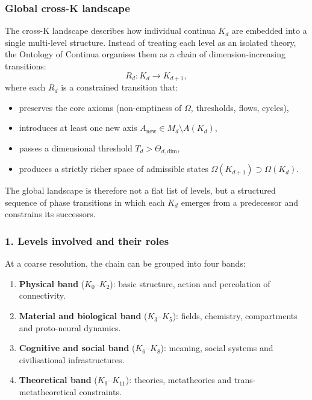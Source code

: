 
\subsubsection{Global cross-K landscape}
\label{sec:crossk-global-landscape}

The cross-K landscape describes how individual continua $K_d$ are embedded
into a single multi-level structure. Instead of treating each level as an
isolated theory, the Ontology of Continua organises them as a chain of
dimension-increasing transitions:
\[
R_d : K_d \rightarrow K_{d+1},
\]
where each $R_d$ is a constrained transition that:
\begin{itemize}
  \item preserves the core axioms (non-emptiness of $\Omega$, thresholds,
        flows, cycles),
  \item introduces at least one new axis $A_{\text{new}} \in M_d \setminus A(K_d)$,
  \item passes a dimensional threshold $T_d > \Theta_{d,\text{dim}}$,
  \item produces a strictly richer space of admissible states
        $\Omega(K_{d+1}) \supset \Omega(K_d)$.
\end{itemize}

The global landscape is therefore not a flat list of levels, but a
structured sequence of phase transitions in which each $K_d$ emerges from
a predecessor and constrains its successors.

\subsubsection{1. Levels involved and their roles}

At a coarse resolution, the chain can be grouped into four bands:
\begin{enumerate}
  \item \textbf{Physical band} ($K_0$--$K_2$): basic structure, action and
        percolation of connectivity.
  \item \textbf{Material and biological band} ($K_3$--$K_5$):
        fields, chemistry, compartments and proto-neural dynamics.
  \item \textbf{Cognitive and social band} ($K_6$--$K_8$):
        meaning, social systems and civilisational infrastructures.
  \item \textbf{Theoretical band} ($K_9$--$K_{11}$):
        theories, metatheories and trans-metatheoretical constraints.
\end{enumerate}

